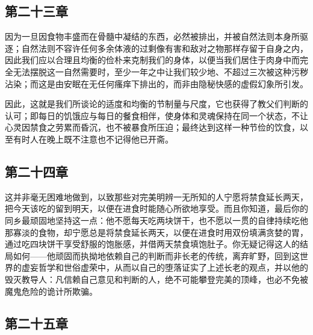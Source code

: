 
\subsection{第二十三章}

\par

因为一旦因食物丰盛而在骨髓中凝结的东西，必然被排出，并被自然法则本身所驱逐；自然法则不容许任何多余体液的过剩像有害和敌对之物那样存留于自身之内，因此我们应以合理且均衡的俭朴来克制我们的身体，以便当我们居住于肉身中而完全无法摆脱这一自然需要时，至少一年之中让我们较少地、不超过三次被这种污秽沾染；而这是由安眠在无任何瘙痒下排出的，而非由隐秘快感的虚假幻象所引发。\par

因此，这就是我们所谈论的适度和均衡的节制量与尺度，它也获得了教父们判断的认可；即每日的饥饿应与每日的餐食相伴，使身体和灵魂保持在同一个状态，不让心灵因禁食之劳累而昏沉，也不被暴食所压迫；最终达到这样一种节俭的饮食，以至有时人在晚上既不注意也不记得他已开斋。\par


\subsection{第二十四章}

\par

这并非毫无困难地做到，以致那些对完美明辨一无所知的人宁愿将禁食延长两天，把今天该吃的留到明天，以便在进食时能随心所欲地享受。而且你知道，最后你的同乡最顽固地坚持这一点：他不愿每天吃两块饼干，也不愿以一贯的自律持续吃他那寡淡的食物，却宁愿总是将禁食延长两天，以便在进食时用双份填满贪婪的胃，通过吃四块饼干享受舒服的饱胀感，并借两天禁食填饱肚子。你无疑记得这人的结局如何——他顽固而执拗地依赖自己的判断而非长老的传统，离弃旷野，回到这世界的虚妄哲学和世俗虚荣中，从而以自己的堕落证实了上述长老的观点，并以他的毁灭教导人：凡信赖自己意见和判断的人，绝不可能攀登完美的顶峰，也必不免被魔鬼危险的诡计所欺骗。\par


\subsection{第二十五章}


